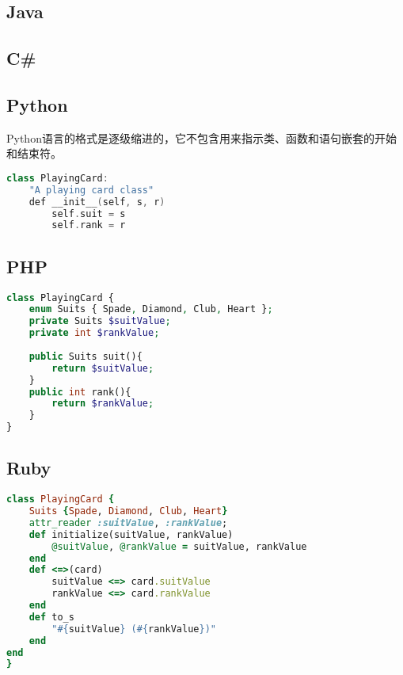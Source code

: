 \subsection{Java}



\subsection{C\#}


\subsection{Python}


Python语言的格式是逐级缩进的，它不包含用来指示类、函数和语句嵌套的开始和结束符。


\begin{lstlisting}[language=C++]
class PlayingCard:
	"A playing card class"
	def __init__(self, s, r)
		self.suit = s
		self.rank = r
\end{lstlisting}


\subsection{PHP}




\begin{lstlisting}[language=PHP]
class PlayingCard {
	enum Suits { Spade, Diamond, Club, Heart };
	private Suits $suitValue;
	private int $rankValue;
	
	public Suits suit(){
		return $suitValue;
	}
	public int rank(){
		return $rankValue;
	}
}
\end{lstlisting}



\subsection{Ruby}



\begin{lstlisting}[language=Ruby]
class PlayingCard {
	Suits {Spade, Diamond, Club, Heart}
	attr_reader :suitValue, :rankValue;
	def initialize(suitValue, rankValue)
		@suitValue, @rankValue = suitValue, rankValue
	end
	def <=>(card)
		suitValue <=> card.suitValue
		rankValue <=> card.rankValue
	end
	def to_s
		"#{suitValue} (#{rankValue})"
	end
end
}
\end{lstlisting}







